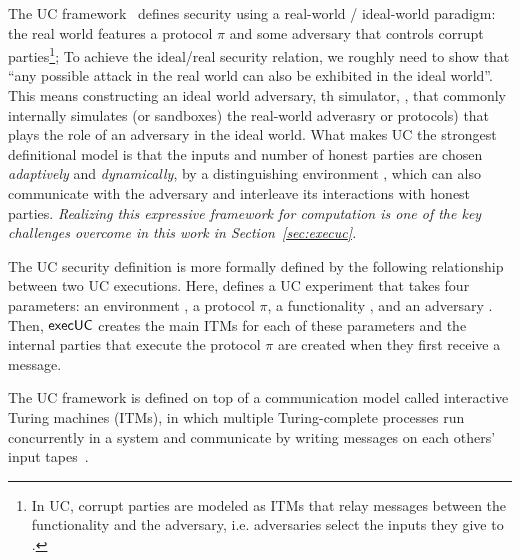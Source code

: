The UC framework~\cite{canettiUC} defines security using
a real-world / ideal-world paradigm:
the real world features a protocol $\pi$ and some adversary \A that controls corrupt parties\footnote{In UC, corrupt parties are modeled as ITMs that relay messages between the functionality and the adversary, i.e. adversaries select the inputs they give to \F.};
To achieve the ideal/real security relation, we roughly need to show that ``any possible attack in the real world can also be exhibited
in the ideal world''.
This means constructing an ideal world adversary, th simulator, \Sim, that commonly internally simulates (or sandboxes) the real-world adverasry or protocols) that plays the role of an adversary in the ideal world.
What makes UC the strongest definitional model is that the inputs and number of honest parties are chosen \emph{adaptively}
and \emph{dynamically}, by a distinguishing environment \Z, which can also communicate with the adversary and interleave its interactions with honest parties.
\emph{Realizing this expressive framework for computation is one of the key challenges overcome in this work in Section~\ref{sec:execuc}.}

The UC security definition is more formally defined by the following relationship between two UC executions. 
Here,  defines a UC experiment that takes four parameters: an environment \Z, a protocol $\pi$, a functionality \F, and an adversary \A.
Then, $\mathsf{execUC}$ creates the main ITMs for each of these parameters and the internal parties that execute the protocol $\pi$ are created when they first receive a message.

The UC framework is defined on top of a communication model called interactive Turing machines (ITMs), in which multiple Turing-complete processes run concurrently in a system and communicate by writing messages on each others' input tapes~\cite{canettiUC}.

